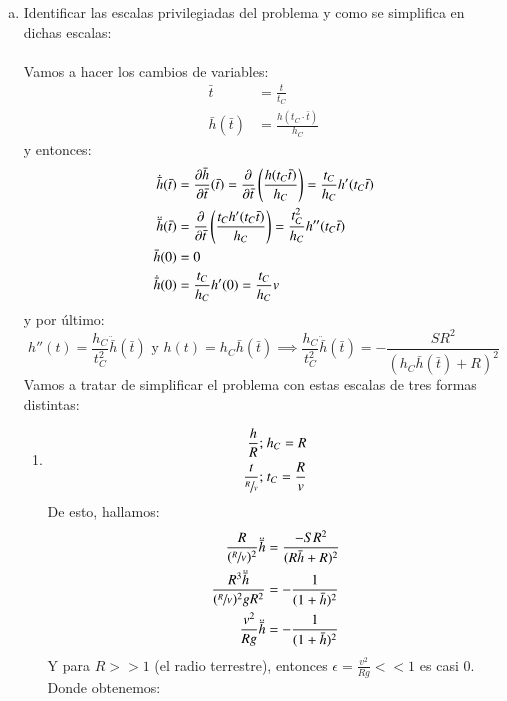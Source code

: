 \begin{ex}[H1.4]
\begin{enumerate}[a)]
        \item Identificar las escalas privilegiadas del problema y como se simplifica en dichas escalas:\\\\
        Vamos a hacer los cambios de variables:
        \begin{align*}
            \bar{t} &= \frac{t}{t_C}\\
            \bar h (\bar t) &= \frac{h(t_C \cdot \bar t)}{h_C}
        \end{align*}
        y entonces:
        \begin{align*}
            \dot{\bar h}(\bar t) &= \frac{\partial \bar h}{\partial \bar t}(\bar t) = \frac{\partial}{\partial \bar t}\left(\frac{h(t_C\bar t)}{h_C}\right) = \frac{t_C}{h_C} h'(t_C \bar t)\\
            \ddot{\bar h}(\bar t) &= \frac{\partial}{\partial \bar t}\left(\frac{t_C h'(t_C \bar t)}{h_C}\right) = \frac{t_C^2}{h_C} h''(t_C \bar t)\\
            \bar h (0) &= 0\\
            \dot{\bar h}(0) &= \frac{t_C}{h_C} h'(0) = \frac{t_C}{h_C} v\\
        \end{align*}
        y por último:
        $$
            h''(t) = \frac{h_C}{t_C^2} \ddot{\bar h}(\bar t) \text { y } h(t) = h_C \bar h (\bar t) \implies \frac{h_C}{t_C^2}\ddot{\bar h}(\bar t) = - \frac{SR^2}{(h_C \bar h(\bar t) + R)^2}
        $$
        Vamos a tratar de simplificar el problema con estas escalas de tres formas distintas:
        \begin{enumerate}[(1)]
            \item
            \begin{align*}
                \frac{h}{R};&\ h_C = R\\
                \frac{t}{\sfrac{R}{v}};&\ t_C = \frac{R}{v}
            \end{align*}
            De esto, hallamos:
            \begin{align*}
                \frac{R}{(\sfrac{R}{V})^2} \ddot{\bar h} &= \frac{-SR^2}{(R\bar h + R)^2}\\
                \frac{R^3 \ddot{\bar h}}{ (\sfrac{R}{V})^2 g R^2 } &= -\frac{1}{(1+\bar h)^2}\\
                \frac{v^2}{Rg} \ddot{\bar{h}} &= -\frac{1}{(1+\bar h)^2}
            \end{align*}
            Y para $R >> 1$ (el radio terrestre), entonces $\epsilon = \frac{v^2}{Rg} << 1$ es casi $0$. Donde obtenemos:

\end{enumerate}
\end{enumerate}
\end{ex}

